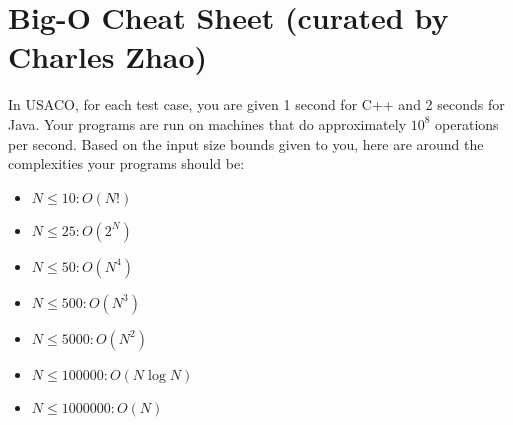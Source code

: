 \documentclass{article}
\begin{document}
\section{Big-O Cheat Sheet (curated by Charles Zhao)}
In USACO, for each test case, you are given 1 second for C++ and 2 seconds for Java. Your programs are run on machines that do approximately $10^{8}$ operations per second. Based on the input size bounds given to you, here are around the complexities your programs should be:
\begin{itemize}
\item $N \le 10: O(N!)$
\item $N \le 25: O(2^{N})$
\item $N \le 50: O(N^{4})$
\item $N \le 500: O(N^{3})$
\item $N \le 5000: O(N^{2})$
\item $N \le 100000: O(N \log N)$
\item $N \le 1000000: O(N)$
\end{itemize}
\end{document}
